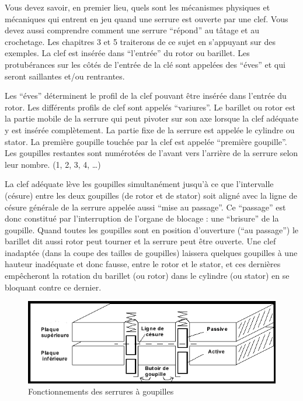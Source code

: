 \documentclass[a4paper,french,11pt,twoside]{report}
\begin{document}
Vous devez savoir, en premier lieu, quels sont les mécanismes physiques et mécaniques qui entrent en jeu quand une serrure est ouverte par une clef. Vous devez aussi comprendre comment une serrure \enquote{répond} au tâtage et au crochetage. Les chapitres 3 et 5 traiterons de ce sujet en s'appuyant sur des exemples.
La clef est insérée dans \enquote{l'entrée} du rotor ou barillet. Les protubérances sur les côtés de l'entrée de la clé sont appelées des \enquote{éves} et qui seront saillantes et/ou rentrantes.

Les \enquote{éves} déterminent le profil de la clef pouvant être insérée dans l'entrée du rotor. Les différents profils de clef sont appelés \enquote{variures}. Le barillet ou rotor est la partie mobile de la serrure qui peut pivoter sur son axe lorsque la clef adéquate y est insérée complètement. La partie fixe de la serrure est appelée le cylindre ou stator. La première goupille touchée par la clef est appelée \enquote{première goupille}. Les goupilles restantes sont numérotées de l'avant vers l'arrière de la serrure selon leur nombre. (1, 2, 3, 4, \ldots)

La clef adéquate lève les goupilles simultanément jusqu'à ce que l'intervalle (césure) entre les deux goupilles (de rotor et de stator) soit aligné avec la ligne de césure générale de la serrure appelée aussi \enquote{mise au  passage}. Ce \enquote{passage} est donc constitué par l'interruption de l'organe de blocage : une \enquote{brisure} de la goupille.  Quand toutes les goupilles sont en position d'ouverture (\enquote{au passage}) le barillet dit aussi rotor peut tourner et la serrure peut être ouverte. Une clef inadaptée (dans la coupe des tailles de goupilles) laissera quelques goupilles à une hauteur inadéquate et donc fausse, entre le rotor et le stator, et ces dernières empêcheront la rotation du barillet (ou rotor) dans le cylindre (ou stator) en se bloquant contre ce dernier.


\begin{figure}[h]

        \includegraphics[width=16cm]{images/image2_goupille}
        \caption{Fonctionnements des serrures à goupilles}

\end{figure}
\end{document}
